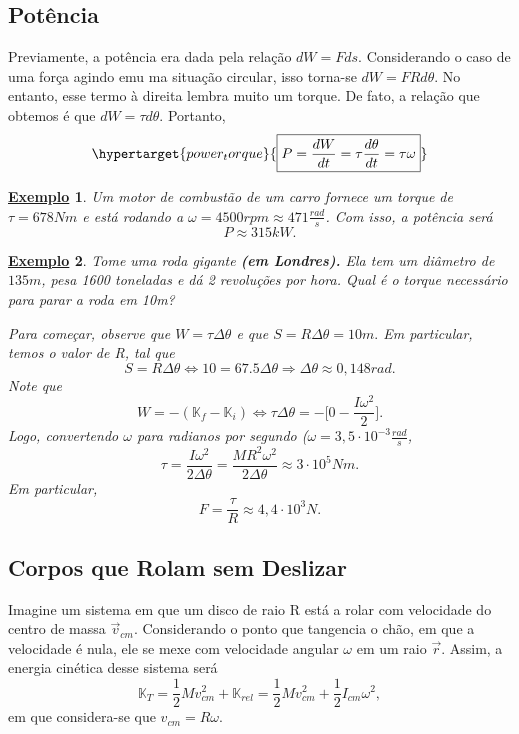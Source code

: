 \documentclass{article}
\newtheorem{example}{\underline{Exemplo}}
\begin{document}
\subsection{Potência}
  Previamente, a potência era dada pela relação \(dW = F ds.\) Considerando o caso de uma força agindo
emu ma situação circular, isso torna-se \(dW = FRd\theta \). No entanto, esse termo à direita lembra muito um torque. De fato,
a relação que obtemos é que \(dW = \tau d\theta \). Portanto, 
  \[
    \hypertarget{power_torque}{\boxed{P = \frac{dW}{dt} = \tau \frac{d\theta }{dt} = \tau \omega }}
  \]
 \begin{example}
   Um motor de combustão de um carro fornece um torque de \(\tau  = 678Nm\) e está rodando a \(\omega = 4500rpm \approx 471 \frac{rad}{s}\).
Com isso, a potência será 
  \[
    P\approx 315kW.
  \]
 \end{example}
\begin{example}
  Tome uma roda gigante \textbf{(em Londres).} Ela tem um diâmetro de \(135m\), pesa 1600 toneladas e dá 2 revoluções por hora.
Qual é o torque necessário para parar a roda em 10m?
  
  Para começar, observe que \(W = \tau \Delta \theta \) e que \(S = R\Delta \theta = 10m.\) Em particular, temos o valor de R, tal que 
    \[
      S = R\Delta \theta \Longleftrightarrow 10 = 67.5\Delta \theta \Rightarrow \Delta \theta \approx 0,148rad.
    \]
  Note que 
    \[
      W = -(\mathbb{K}_{f} - \mathbb{K}_{i}) \Longleftrightarrow \tau \Delta \theta = -\biggl[0 - \frac{I\omega^{2}}{2}\biggr].
    \]
  Logo, convertendo \(\omega \) para radianos por segundo (\(\omega = 3,5 \cdot 10^{-3}\frac{rad}{s}\),
    \[
      \tau = \frac{I\omega^{2}}{2\Delta \theta } = \frac{MR^{2}\omega^{2}}{2\Delta \theta } \approx 3 \cdot 10^{5}Nm.
    \]
    Em particular, 
      \[
        F = \frac{\tau }{R}\approx 4,4 \cdot 10^{3}N.
      \]
\end{example}
\subsection{Corpos que Rolam sem Deslizar}
  Imagine um sistema em que um disco de raio R está a rolar com velocidade do centro de massa \(\vec{v}_{cm}.\) Considerando o ponto que tangencia o chão, em que a velocidade é nula,
ele se mexe com velocidade angular \(\omega \) em um raio \(\vec{r}\). Assim, a energia cinética desse sistema será 
  \[
    \mathbb{K}_{T} = \frac{1}{2} Mv_{cm}^{2} + \mathbb{K}_{rel} = \frac{1}{2}Mv_{cm}^{2} + \frac{1}{2}I_{cm}\omega ^{2},
  \]
  em que considera-se que \(v_{cm} = R\omega.\) 
\end{document}
